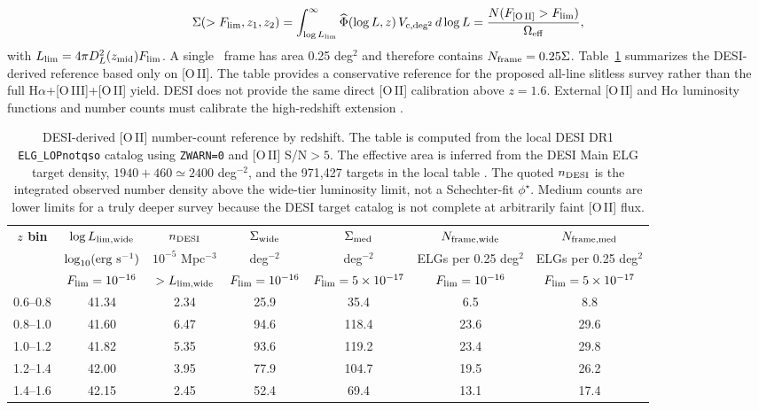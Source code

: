 \begin{equation}
  \Sigma(>F_{\rm lim},z_1,z_2)=
  \int_{\log L_{\rm lim}}^\infty
  \widehat{\Phi}(\log L,z)\,V_{\rm c,deg^2}\,d\log L
  =
  \frac{N(F_{\rm [O\,II]}>F_{\rm lim})}{\Omega_{\rm eff}},
\end{equation}
with $L_{\rm lim}=4\pi D_L^2(z_{\rm mid})F_{\rm lim}$. A single \fovlarge\ frame has area 0.25 deg$^2$ and therefore contains $N_{\rm frame}=0.25\Sigma$. Table~\ref{tab:desiLFcounts} summarizes the DESI-derived reference based only on [O\,II]. The table provides a conservative reference for the proposed all-line slitless survey rather than the full H$\alpha$+[O\,III]+[O\,II] yield. DESI does not provide the same direct [O\,II] calibration above $z=1.6$. External [O\,II] and H$\alpha$ luminosity functions and number counts must calibrate the high-redshift extension \cite{comparat2015,saito2020,mehta2015}.

\begin{table}[htbp]
\centering
\sffamily\scriptsize
\begin{tabularx}{\textwidth}{@{}c c c c c c c@{}}
\toprule
\textbf{$z$ bin} & \textbf{$\log L_{\rm lim,wide}$} & \textbf{$n_{\rm DESI}$} & \textbf{$\Sigma_{\rm wide}$} & \textbf{$\Sigma_{\rm med}$} & \textbf{$N_{\rm frame,wide}$} & \textbf{$N_{\rm frame,med}$}\\
 & $\log_{10}({\rm erg\ s}^{-1})$ & $10^{-5}$ Mpc$^{-3}$ & deg$^{-2}$ & deg$^{-2}$ & ELGs per 0.25 deg$^2$ & ELGs per 0.25 deg$^2$\\
 & $F_{\rm lim}=10^{-16}$ & $>L_{\rm lim,wide}$ & $F_{\rm lim}=10^{-16}$ & $F_{\rm lim}=5\times10^{-17}$ & $F_{\rm lim}=10^{-16}$ & $F_{\rm lim}=5\times10^{-17}$\\
\midrule
0.6--0.8 & 41.34 & 2.34 & 25.9 & 35.4 & 6.5 & 8.8\\
0.8--1.0 & 41.60 & 6.47 & 94.6 & 118.4 & 23.6 & 29.6\\
1.0--1.2 & 41.82 & 5.35 & 93.6 & 119.2 & 23.4 & 29.8\\
1.2--1.4 & 42.00 & 3.95 & 77.9 & 104.7 & 19.5 & 26.2\\
1.4--1.6 & 42.15 & 2.45 & 52.4 & 69.4 & 13.1 & 17.4\\
\bottomrule
\end{tabularx}
\caption{DESI-derived [O\,II] number-count reference by redshift. The table is computed from the local DESI DR1 \texttt{ELG\_LOPnotqso} catalog using \texttt{ZWARN=0} and [O\,II] S/N$>5$. The effective area is inferred from the DESI Main ELG target density, $1940+460\simeq2400$ deg$^{-2}$, and the 971,427 targets in the local table \cite{raichoor2022}. The quoted $n_{\rm DESI}$ is the integrated observed number density above the wide-tier luminosity limit, not a Schechter-fit $\phi^\star$. Medium counts are lower limits for a truly deeper survey because the DESI target catalog is not complete at arbitrarily faint [O\,II] flux.}
\label{tab:desiLFcounts}
\end{table}

